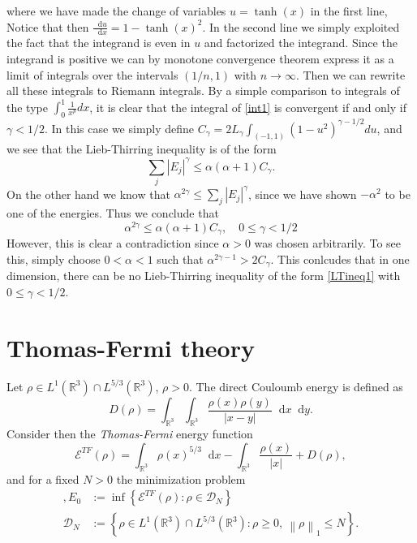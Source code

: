 \documentclass[a4paper,11pt]{article}
\newcommand{\norm}[1]{\left\lVert #1 \right\rVert}
\newcommand{\abs}[1]{\left\lvert #1 \right\rvert}
\newcommand*\diff{\mathop{}\!\mathrm{d}}
\newcommand{\R}{\mathbb{R}}
\numberwithin{equation}{section}
\begin{document}
where we have made the change of variables $ u=\tanh(x) $ in the first line, Notice that then $ \frac{\diff u}{\diff x}=1-\tanh(x)^2 $. In the second line we simply exploited the fact that the integrand is even in $ u $ and factorized the integrand. Since the integrand is positive we can by monotone convergence theorem express it as a limit of integrals over the intervals $ (1/n,1) $ with $ n\to \infty $. Then we can rewrite all these integrals to Riemann integrals. By a simple comparison to integrals of the type $ \int_{0}^{1}\frac{1}{x^p}dx $, it is clear that the integral of \eqref{int1} is convergent if and only if $ \gamma<1/2 $. In this case we simply define $ C_\gamma=2L_\gamma\int_{(-1,1)}(1-u^2)^{\gamma-1/2} du $, and we see that the Lieb-Thirring inequality is of the form\begin{equation}
\sum_j\abs{E_j}^\gamma\leq\alpha(\alpha+1)C_\gamma.
\end{equation}
On the other hand we know that $ \alpha^{2\gamma}\leq\sum_j\abs{E_j}^\gamma $, since we have shown $ -\alpha^2 $ to be one of the energies. Thus we conclude that \begin{equation}
\alpha^{2\gamma}\leq\alpha(\alpha+1)C_\gamma,\quad 0\leq \gamma<1/2
\end{equation}
However, this is clear a contradiction since $ \alpha>0 $ was chosen arbitrarily. To see this, simply choose $ 0<\alpha<1 $ such that  $ \alpha^{2\gamma-1}> 2C_\gamma $. This conlcudes that in one dimension, there can be no Lieb-Thirring inequality of the form \eqref{LTineq1} with $ 0\leq\gamma<1/2 $.
\section{Thomas-Fermi theory}
Let $ \rho\in L^1(\R^3)\cap L^{5/3}(\R^3) $, $ \rho>0 $. The direct Couloumb energy is defined as \begin{equation}
D(\rho)=\int_{\R^3}\int_{\R^3}\frac{\rho(x)\rho(y)}{\abs{x-y}}\diff x\diff y. 
\end{equation}
Consider then the \emph{Thomas-Fermi} energy function \begin{equation}
\mathcal{E}^{TF}(\rho)=\int_{\R^3}\rho(x)^{5/3} \diff x -\int_{\R^3}\frac{\rho(x)}{\abs{x}}+D(\rho),
\end{equation} 
and for a fixed $ N>0 $ the minimization problem \begin{equation}
\begin{aligned},
E_0&:=\inf\left\{\mathcal{E}^{TF}(\rho) : \rho\in\mathcal{D}_N \right\}\\
\mathcal{D}_N&:=\left\{\rho\in L^1(\R^3)\cap L^{5/3}(\R^3) : \rho\geq0,\ \norm{\rho}_1\leq N \right\}.
\end{aligned}
\end{equation}
\end{document}
